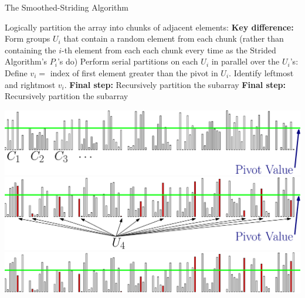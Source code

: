 \documentclass[xcolor=x11names, svgnames, rgb]{beamer}
\begin{document}
\begin{frame}[t]{}
	\vfill
	\begin{center}
		{\Huge The Smoothed-Striding Algorithm}
	\end{center}
	\vfill
\end{frame}


\begin{frame}[t]{}%
	\vspace{0.25cm}
	\begin{overprint}
	Logically partition the array into chunks of adjacent elements:
	\onslide<2>\textbf{Key difference:} Form groups $U_i$ that contain a random element from each chunk (rather than containing the $i$-th element from each each chunk every time as the Strided Algorithm's $P_i$'s do)
	\onslide<3>Perform serial partitions on each $U_i$ in parallel over the $U_i$'s:
	\onslide<4>Define $v_i = $ index of first element greater than the pivot in $U_i$. 
	\onslide<5>Identify leftmost and rightmost $v_i$.
	\onslide<6>\textbf{Final step:} Recursively partition the subarray
	\onslide<7>\textbf{Final step:} Recursively partition the subarray
	\end{overprint}
	\vspace{0.25cm}
	\begin{overprint}
	\includegraphics[width=\linewidth]{imgs/smoothedAlgSim/smoothedAlgSim_1.eps}
	\onslide<2>\includegraphics[width=\linewidth]{imgs/smoothedAlgSim/smoothedAlgSim_2.eps}
	\onslide<3>\includegraphics[width=\linewidth]{imgs/smoothedAlgSim/smoothedAlgSim_3.eps}

\end{overprint}
\end{frame}
\end{document}
